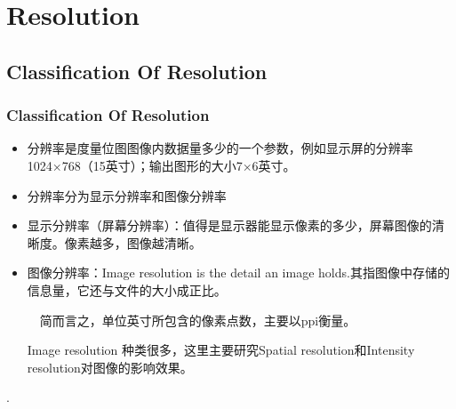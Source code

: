 \documentclass[notheorems,serif,table,compress]{beamer}  %
\begin{document}
\section{Resolution}





\subsection{Classification Of Resolution }

\begin{frame}
\frametitle{Classification Of Resolution }
\begin{itemize}
  \item 分辨率是度量位图图像内数据量多少的一个参数，例如显示屏的分辨率1024×768（15英寸）；输出图形的大小7×6英寸。
  \item 分辨率分为显示分辨率和图像分辨率
   
   \item 显示分辨率（屏幕分辨率）：值得是显示器能显示像素的多少，屏幕图像的清晰度。像素越多，图像越清晰。

   \item 图像分辨率：Image resolution is the detail an image holds.其指图像中存储的信息量，它还与文件的大小成正比。
  
  ~~简而言之，单位英寸所包含的像素点数，主要以ppi衡量。

  {\color{blue}Image resolution 种类很多，这里主要研究Spatial resolution和Intensity resolution对图像的影响效果。}

  \end{itemize}.
\end{frame}
 
\end{document}
